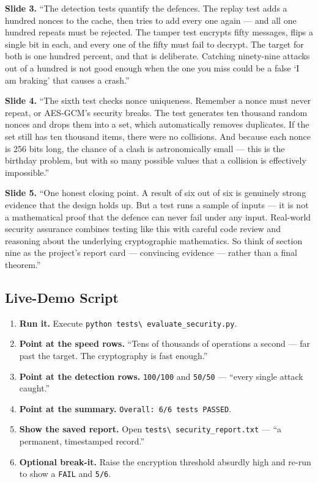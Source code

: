 \documentclass[11pt,a4paper]{report}
\begin{document}
\textbf{Slide 3.} ``The detection tests quantify the defences. The replay test
adds a hundred nonces to the cache, then tries to add every one again --- and all
one hundred repeats must be rejected. The tamper test encrypts fifty messages,
flips a single bit in each, and every one of the fifty must fail to decrypt. The
target for both is one hundred percent, and that is deliberate. Catching
ninety-nine attacks out of a hundred is not good enough when the one you miss
could be a false `I am braking' that causes a crash.''

\textbf{Slide 4.} ``The sixth test checks nonce uniqueness. Remember a nonce must
never repeat, or AES-GCM's security breaks. The test generates ten thousand
random nonces and drops them into a set, which automatically removes duplicates.
If the set still has ten thousand items, there were no collisions. And because
each nonce is 256 bits long, the chance of a clash is astronomically small ---
this is the birthday problem, but with so many possible values that a collision
is effectively impossible.''

\textbf{Slide 5.} ``One honest closing point. A result of six out of six is
genuinely strong evidence that the design holds up. But a test runs a sample of
inputs --- it is not a mathematical proof that the defence can never fail under
any input. Real-world security assurance combines testing like this with careful
code review and reasoning about the underlying cryptographic mathematics. So
think of section nine as the project's report card --- convincing evidence ---
rather than a final theorem.''

\subsection{Live-Demo Script}
\begin{enumerate}
  \item \textbf{Run it.} Execute \texttt{python tests\textbackslash
        evaluate\_security.py}.
  \item \textbf{Point at the speed rows.} ``Tens of thousands of operations a
        second --- far past the target. The cryptography is fast enough.''
  \item \textbf{Point at the detection rows.} \texttt{100/100} and \texttt{50/50}
        --- ``every single attack caught.''
  \item \textbf{Point at the summary.} \texttt{Overall: 6/6 tests PASSED}.
  \item \textbf{Show the saved report.} Open \texttt{tests\textbackslash
        security\_report.txt} --- ``a permanent, timestamped record.''
  \item \textbf{Optional break-it.} Raise the encryption threshold absurdly high
        and re-run to show a \texttt{FAIL} and \texttt{5/6}.
\end{enumerate}
\end{document}
